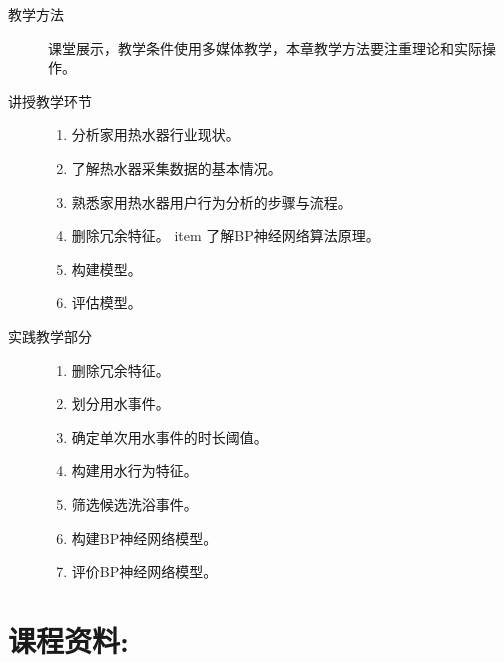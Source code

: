 \documentclass[12pt,a4paper,openany,cap]{ctexbook}
\begin{document}
\begin{description}
\item[教学方法]课堂展示，教学条件使用多媒体教学，本章教学方法要注重理论和实际操作。
\item[讲授教学环节]
  \begin{minipage}[t]{0.8\linewidth}
    \begin{enumerate}
    \item    分析家用热水器行业现状。
\item\label{item:251}  了解热水器采集数据的基本情况。
\item\label{item:252}  熟悉家用热水器用户行为分析的步骤与流程。
\item\label{item:253}  删除冗余特征。
item\label{item:260}  了解BP神经网络算法原理。
\item\label{item:261}  构建模型。
\item\label{item:262}  评估模型。
    \end{enumerate}
  \end{minipage}

\item[实践教学部分]
  \begin{minipage}[t]{0.8\linewidth}
    \begin{enumerate}
    \item 删除冗余特征。
\item\label{item:263}  划分用水事件。
\item\label{item:264}  确定单次用水事件的时长阈值。
\item\label{item:265}  构建用水行为特征。
\item\label{item:266}  筛选候选洗浴事件。
\item\label{item:267}  构建BP神经网络模型。
\item\label{item:268}  评价BP神经网络模型。
    \end{enumerate}
  \end{minipage}

  
\end{description}






\section{课程资料:}
\end{document}
